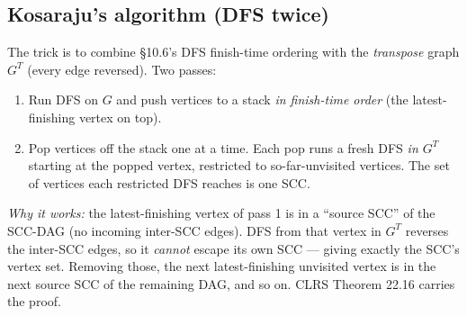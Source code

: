 \documentclass[11pt]{article}
\begin{document}
\subsection*{Kosaraju's algorithm (DFS twice)}

The trick is to combine \S10.6's DFS finish-time ordering with the
\emph{transpose} graph $G^T$ (every edge reversed). Two passes:

\begin{enumerate}
    \item Run DFS on $G$ and push vertices to a stack \emph{in
          finish-time order} (the latest-finishing vertex on top).
    \item Pop vertices off the stack one at a time. Each pop runs
          a fresh DFS \emph{in $G^T$} starting at the popped
          vertex, restricted to so-far-unvisited vertices. The set
          of vertices each restricted DFS reaches is one SCC.
\end{enumerate}

\emph{Why it works:} the latest-finishing vertex of pass 1 is in a
``source SCC'' of the SCC-DAG (no incoming inter-SCC edges). DFS
from that vertex in $G^T$ reverses the inter-SCC edges, so it
\emph{cannot} escape its own SCC --- giving exactly the SCC's
vertex set. Removing those, the next latest-finishing unvisited
vertex is in the next source SCC of the remaining DAG, and so on.
CLRS Theorem 22.16 carries the proof.
\end{document}

